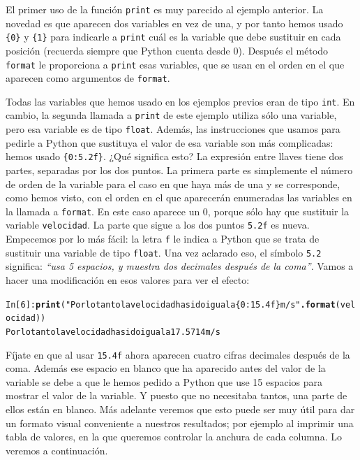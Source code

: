 \documentclass[10pt,a4paper]{article}\usepackage[]{graphicx}\usepackage[]{color}
\makeatletter
\newcommand{\hlstr}[1]{\textcolor[rgb]{0.192,0.494,0.8}{#1}}%
\newcommand{\hlkwd}[1]{\textcolor[rgb]{0.737,0.353,0.396}{\textbf{#1}}}%
\newenvironment{kframe}{%
 \def\at@end@of@kframe{}%
 \ifinner\ifhmode%
  \def\at@end@of@kframe{\end{minipage}}%
  \begin{minipage}{\columnwidth}%
 \fi\fi%
 \def\FrameCommand##1{\hskip\@totalleftmargin \hskip-\fboxsep
 \colorbox{shadecolor}{##1}\hskip-\fboxsep
     \hskip-\linewidth \hskip-\@totalleftmargin \hskip\columnwidth}%
 \MakeFramed {\advance\hsize-\width
   \@totalleftmargin\z@ \linewidth\hsize
   \@setminipage}}%
 {\par\unskip\endMakeFramed%
 \at@end@of@kframe}
\newenvironment{knitrout}{}{} %
\newcounter {cont01}
\makeatother
\begin{document}
El primer uso de la función {\tt print} es muy parecido al ejemplo anterior. La novedad es que aparecen dos variables en vez de una, y por tanto hemos usado {\tt\{0\}} y {\tt\{1\}} para indicarle a {\tt print} cuál es la variable que debe sustituir en cada posición (recuerda siempre que Python cuenta desde 0). Después el método {\tt format} le proporciona a {\tt print} esas variables, que se usan en el orden en el que aparecen como argumentos de {\tt format}.

Todas las variables que hemos usado en los ejemplos previos eran de tipo {\tt int}. En cambio, la  segunda llamada a {\tt print} de este ejemplo utiliza sólo una variable, pero esa variable es de tipo {\tt float}.  Además, las instrucciones que usamos para pedirle a Python que sustituya el valor de esa variable son más complicadas: hemos usado {\tt\{0:5.2f\}}. ¿Qué significa esto? La expresión entre llaves tiene dos partes, separadas por los dos puntos. La primera parte es simplemente el número de orden de la variable para el caso en que haya más de una y se corresponde, como hemos visto, con el orden en el que aparecerán enumeradas las variables en la llamada a {\tt format}. En este caso aparece un $0$, porque sólo hay que sustituir la variable {\tt velocidad}. La parte que sigue a los dos puntos {\tt 5.2f} es nueva. Empecemos por lo más fácil: la letra {\tt f} le indica a Python que se trata de sustituir una variable de tipo {\tt float}. Una vez aclarado eso, el símbolo {\tt 5.2} significa: {\em ``usa 5 espacios, y muestra dos decimales después de la coma''}. Vamos a hacer una modificación en esos valores para ver el efecto:
\begin{knitrout}
\color{fgcolor}\begin{kframe}
\begin{alltt}
In [6]: \hlkwd{print}(\hlstr{"Por lo tanto la velocidad ha sido igual a \{0:15.4f\} m/s"}\hlkwd{.format}(velocidad))
Por lo tanto la velocidad ha sido igual a         17.5714 m/s
\end{alltt}
\end{kframe}
\end{knitrout}
Fíjate en que al usar {\tt 15.4f} ahora aparecen cuatro cifras decimales después de la coma. Además ese espacio en blanco que ha aparecido antes del valor de la variable se debe a que le hemos pedido a Python que use 15 espacios para mostrar el valor de la variable. Y puesto que no necesitaba tantos, una parte de ellos están en blanco. Más adelante veremos que esto puede ser muy útil para dar un formato visual conveniente a nuestros resultados; por ejemplo al imprimir una tabla de valores, en la que queremos controlar la anchura de cada columna. Lo veremos a continuación.
\end{document}

